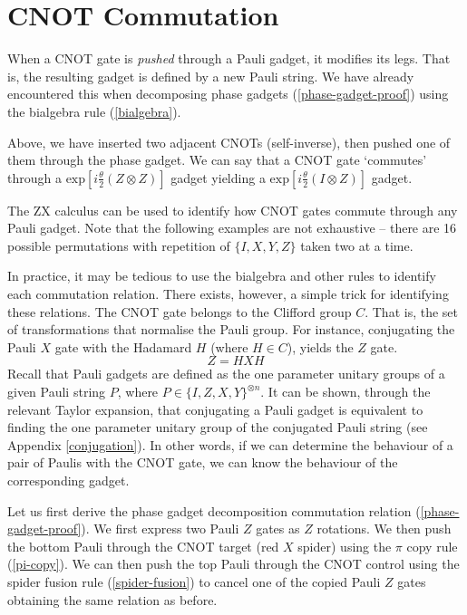 \section{CNOT Commutation}

When a CNOT gate is \textit{pushed} through a Pauli gadget, it modifies its legs. That is, the resulting gadget is defined by a new Pauli string. We have already encountered this when decomposing phase gadgets (\ref{phase-gadget-proof}) using the bialgebra rule (\ref{bialgebra}).


Above, we have inserted two adjacent CNOTs (self-inverse), then pushed one of them through the phase gadget. We can say that a CNOT gate `commutes' through a $\text{exp} [i\frac{\theta}{2} (Z \otimes Z)]$ gadget yielding a $\text{exp} [i\frac{\theta}{2} (I \otimes Z)]$ gadget.


The ZX calculus can be used to identify how CNOT gates commute through any Pauli gadget. Note that the following examples are not exhaustive -- there are 16 possible permutations with repetition of $\{I, X, Y, Z\}$ taken two at a time.


In practice, it may be tedious to use the bialgebra and other rules to identify each commutation relation. There exists, however, a simple trick for identifying these relations. The CNOT gate belongs to the Clifford group $C$. That is, the set of transformations that normalise the Pauli group. For instance, conjugating the Pauli $X$ gate with the Hadamard $H$ (where $H \in C$), yields the $Z$ gate.
\begin{equation*}
    Z = HXH
\end{equation*}
Recall that Pauli gadgets are defined as the one parameter unitary groups of a given Pauli string $P$, where $P \in \{I, Z, X, Y\}^{\otimes n}$. It can be shown, through the relevant Taylor expansion, that conjugating a Pauli gadget is equivalent to finding the one parameter unitary group of the conjugated Pauli string (see Appendix \ref{conjugation}). In other words, if we can determine the behaviour of a pair of Paulis with the CNOT gate, we can know the behaviour of the corresponding gadget.

Let us first derive the phase gadget decomposition commutation relation (\ref{phase-gadget-proof}). We first express two Pauli $Z$ gates as $Z$ rotations. We then push the bottom Pauli through the CNOT target (red $X$ spider) using the $\pi$ copy rule (\ref{pi-copy}). We can then push the top Pauli through the CNOT control using the spider fusion rule (\ref{spider-fusion}) to cancel one of the copied Pauli $Z$ gates obtaining the same relation as before.

